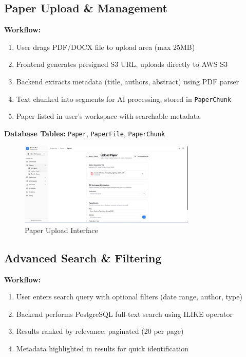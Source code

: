 \subsection{Paper Upload \& Management}

\textbf{Workflow:}
\begin{enumerate}[leftmargin=*,topsep=3pt,itemsep=2pt]
    \item User drags PDF/DOCX file to upload area (max 25MB)
    \item Frontend generates presigned S3 URL, uploads directly to AWS S3
    \item Backend extracts metadata (title, authors, abstract) using PDF parser
    \item Text chunked into segments for AI processing, stored in \texttt{PaperChunk}
    \item Paper listed in user's workspace with searchable metadata
\end{enumerate}

\textbf{Database Tables:} \texttt{Paper}, \texttt{PaperFile}, \texttt{PaperChunk}

\begin{figure}[H]
\centering
\includegraphics[width=0.75\textwidth]{images/screenshots/paper_upload.png}
\caption{Paper Upload Interface}
\label{fig:upload}
\end{figure}

\subsection{Advanced Search \& Filtering}

\textbf{Workflow:}
\begin{enumerate}[leftmargin=*,topsep=3pt,itemsep=2pt]
    \item User enters search query with optional filters (date range, author, type)
    \item Backend performs PostgreSQL full-text search using ILIKE operator
    \item Results ranked by relevance, paginated (20 per page)
    \item Metadata highlighted in results for quick identification
\end{enumerate}

